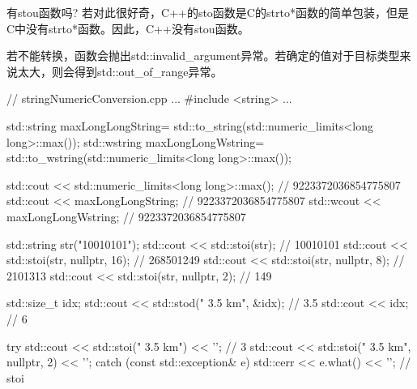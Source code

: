\begin{myNotic}{有stou函数吗?}
若对此很好奇，C++的sto函数是C的strto*函数的简单包装，但是C中没有strto*函数。因此，C++没有stou函数。
\end{myNotic}

若不能转换，函数会抛出std::invalid\_argument异常。若确定的值对于目标类型来说太大，则会得到std::out\_of\_range异常。


\begin{cpp}
// stringNumericConversion.cpp
...
#include <string>
...

std::string maxLongLongString=
			std::to_string(std::numeric_limits<long long>::max());
std::wstring maxLongLongWstring=
			std::to_wstring(std::numeric_limits<long long>::max());

std::cout << std::numeric_limits<long long>::max(); // 9223372036854775807
std::cout << maxLongLongString; // 9223372036854775807
std::wcout << maxLongLongWstring; // 9223372036854775807

std::string str("10010101");
std::cout << std::stoi(str); // 10010101
std::cout << std::stoi(str, nullptr, 16); // 268501249
std::cout << std::stoi(str, nullptr, 8); // 2101313
std::cout << std::stoi(str, nullptr, 2); // 149

std::size_t idx;
std::cout << std::stod(" 3.5 km", &idx); // 3.5
std::cout << idx; // 6

try{
	std::cout << std::stoi(" 3.5 km") << '\n'; // 3
	std::cout << std::stoi(" 3.5 km", nullptr, 2) << '\n';
}
catch (const std::exception& e){
	std::cerr << e.what() << '\n';
} // stoi
\end{cpp}














